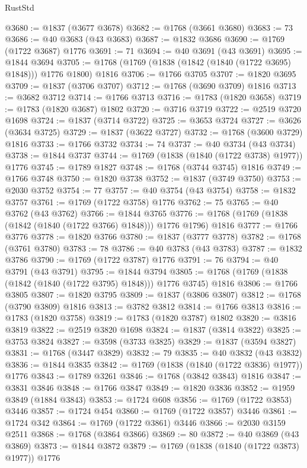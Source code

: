 \begin{lexlean}{RustStd}
\begin{coremodule}
@3680 := @1837 (@3677 @3678)
@3682 := @1768 (@3661 @3680)
@3683 := 73
@3686 := @40 @3683 (@43 @3683)
@3687 := @1832 @3686
@3690 := @1769 (@1722 @3687) @1776
@3691 := 71
@3694 := @40 @3691 (@43 @3691)
@3695 := @1844 @3694
@3705 := @1768 (@1769 (@1838 (@1842 (@1840 (@1722 @3695) @1848))) @1776 @1800) @1816
@3706 := @1766 @3705
@3707 := @1820 @3695
@3709 := @1837 (@3706 @3707)
@3712 := @1768 (@3690 @3709) @1816
@3713 := @3682 @3712
@3714 := @1766 @3713
@3716 := @1783 (@1820 @3658)
@3719 := @1783 (@1820 @3687) @1802
@3720 := @3716 @3719
@3722 := @2519 @3720 @1698
@3724 := @1837 (@3714 @3722)
@3725 := @3653 @3724
@3727 := @3626 (@3634 @3725)
@3729 := @1837 (@3622 @3727)
@3732 := @1768 (@3600 @3729) @1816
@3733 := @1766 @3732
@3734 := 74
@3737 := @40 @3734 (@43 @3734)
@3738 := @1844 @3737
@3744 := @1769 (@1838 (@1840 (@1722 @3738) @1977)) @1776
@3745 := @1789 @1827
@3748 := @1768 (@3744 @3745) @1816
@3749 := @1766 @3748
@3750 := @1820 @3738
@3752 := @1837 (@3749 @3750)
@3753 := @2030 @3752
@3754 := 77
@3757 := @40 @3754 (@43 @3754)
@3758 := @1832 @3757
@3761 := @1769 (@1722 @3758) @1776
@3762 := 75
@3765 := @40 @3762 (@43 @3762)
@3766 := @1844 @3765
@3776 := @1768 (@1769 (@1838 (@1842 (@1840 (@1722 @3766) @1848))) @1776 @1796) @1816
@3777 := @1766 @3776
@3778 := @1820 @3766
@3780 := @1837 (@3777 @3778)
@3782 := @1768 (@3761 @3780)
@3783 := 78
@3786 := @40 @3783 (@43 @3783)
@3787 := @1832 @3786
@3790 := @1769 (@1722 @3787) @1776
@3791 := 76
@3794 := @40 @3791 (@43 @3791)
@3795 := @1844 @3794
@3805 := @1768 (@1769 (@1838 (@1842 (@1840 (@1722 @3795) @1848))) @1776 @3745) @1816
@3806 := @1766 @3805
@3807 := @1820 @3795
@3809 := @1837 (@3806 @3807)
@3812 := @1768 (@3790 @3809) @1816
@3813 := @3782 @3812
@3814 := @1766 @3813
@3816 := @1783 (@1820 @3758)
@3819 := @1783 (@1820 @3787) @1802
@3820 := @3816 @3819
@3822 := @2519 @3820 @1698
@3824 := @1837 (@3814 @3822)
@3825 := @3753 @3824
@3827 := @3598 (@3733 @3825)
@3829 := @1837 (@3594 @3827)
@3831 := @1768 (@3447 @3829)
@3832 := 79
@3835 := @40 @3832 (@43 @3832)
@3836 := @1844 @3835
@3842 := @1769 (@1838 (@1840 (@1722 @3836) @1977)) @1776
@3843 := @1789 @3261
@3846 := @1768 (@3842 @3843) @1816
@3847 := @3831 @3846
@3848 := @1766 @3847
@3849 := @1820 @3836
@3852 := @1959 @3849 (@1884 @3843)
@3853 := @1724 @608
@3856 := @1769 (@1722 @3853) @3446
@3857 := @1724 @454
@3860 := @1769 (@1722 @3857) @3446
@3861 := @1724 @342
@3864 := @1769 (@1722 @3861) @3446
@3866 := @2030 @3159 @2511
@3868 := @1768 (@3864 @3866)
@3869 := 80
@3872 := @40 @3869 (@43 @3869)
@3873 := @1844 @3872
@3879 := @1769 (@1838 (@1840 (@1722 @3873) @1977)) @1776

\end{coremodule}
\end{lexlean}
